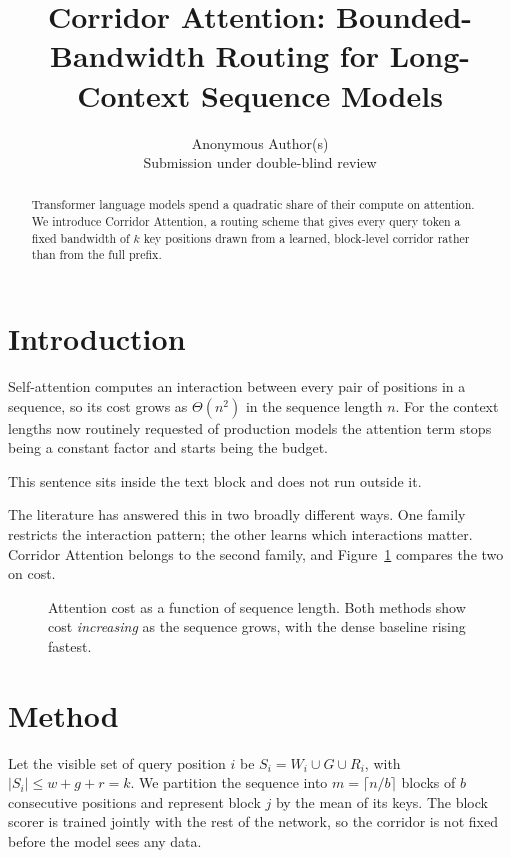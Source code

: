 \documentclass[11pt,twocolumn]{article}
\title{Corridor Attention: Bounded-Bandwidth Routing for Long-Context Sequence Models}
\author{Anonymous Author(s)\\Submission under double-blind review}
\date{}
\begin{document}
\maketitle

\begin{abstract}
Transformer language models spend a quadratic share of their compute on
attention. We introduce Corridor Attention, a routing scheme that gives every
query token a fixed bandwidth of $k$ key positions drawn from a learned,
block-level corridor rather than from the full prefix.
\end{abstract}

\section{Introduction}
\label{sec:intro}
Self-attention computes an interaction between every pair of positions in a
sequence, so its cost grows as $\Theta(n^2)$ in the sequence length $n$. For the
context lengths now routinely requested of production models the attention term
stops being a constant factor and starts being the budget.

\noindent This sentence sits inside the text block and does not run outside it.

The literature has answered this in two broadly different ways. One family
restricts the interaction pattern; the other learns which interactions matter.
Corridor Attention belongs to the second family, and Figure~\ref{fig:cost}
compares the two on cost.

\begin{figure}[t]
\centering
{}
\caption{Attention cost as a function of sequence length. Both methods show cost
\emph{increasing} as the sequence grows, with the dense baseline rising fastest.}
\label{fig:cost}
\end{figure}

\section{Method}
\label{sec:method}
Let the visible set of query position $i$ be $S_i = W_i \cup G \cup R_i$, with
$|S_i| \le w + g + r = k$. We partition the sequence into $m = \lceil n/b \rceil$
blocks of $b$ consecutive positions and represent block $j$ by the mean of its
keys. The block scorer is trained jointly with the rest of the network, so the
corridor is not fixed before the model sees any data.
\end{document}
